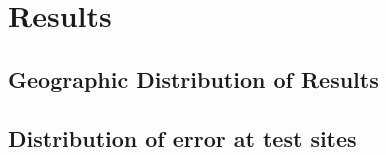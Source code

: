 \chapter{Results}
\section{Geographic Distribution of Results}
\section{Distribution of error at test sites}
